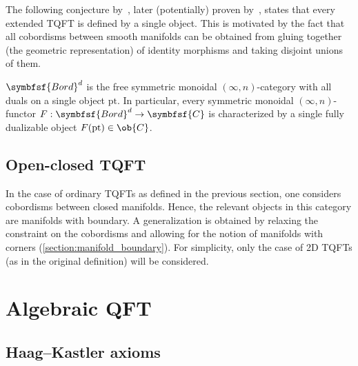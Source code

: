     The following conjecture by~\citet{baez_higherdimensional_1995}, later (potentially) proven by~\citet{lurie_classification_2009,grady_geometric_2022}, states that every extended TQFT is defined by a single object. This is motivated by the fact that all cobordisms between smooth manifolds can be obtained from gluing together (the geometric representation) of identity morphisms and taking disjoint unions of them.
    \begin{conjecture}\label{aqft:cobordism_hypothesis}
        $\symbfsf{Bord}^d$ is the free symmetric monoidal $(\infty,n)$-category with all duals on a single object $\mathrm{pt}$. In particular, every symmetric monoidal $(\infty,n)$-functor $F:\symbfsf{Bord}^d\rightarrow\symbfsf{C}$ is characterized by a single fully dualizable object $F(\mathrm{pt})\in\ob{C}$.
    \end{conjecture}

\subsection{Open-closed TQFT}

    In the case of ordinary TQFTs as defined in the previous section, one considers cobordisms between closed manifolds. Hence, the relevant objects in this category are manifolds with boundary. A generalization is obtained by relaxing the constraint on the cobordisms and allowing for the notion of manifolds with corners (\cref{section:manifold_boundary}). For simplicity, only the case of 2D TQFTs (as in the original definition) will be considered.


\section{Algebraic QFT}
\subsection{Haag--Kastler axioms}\label{section:haag_kastler}

